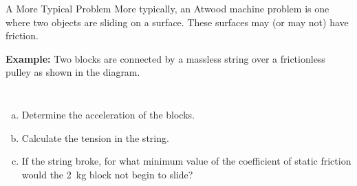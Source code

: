 \documentclass[12pt,compress,aspectratio=169]{beamer}
\begin{document}
\begin{frame}{A More Typical Problem}
  More typically, an Atwood machine problem is one where two objects are
  sliding on a surface. These surfaces may (or may not) have friction.

  \vspace{.1in}\textbf{Example:} Two blocks are connected by a massless string
  over a frictionless pulley as shown in the diagram.
  \begin{columns}

    \begin{enumerate}[(a)]
    \item Determine the acceleration of the blocks.
    \item Calculate the tension in the string.
    \item If the string broke, for what minimum value of the coefficient of
      static friction would the \SI{2}{kg} block not begin to slide?
    \end{enumerate}
  \end{columns}
\end{frame}
\end{document}
